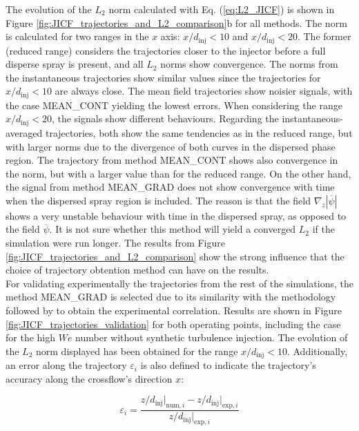 The evolution of the $L_2$ norm calculated with Eq. (\ref{eq:L2_JICF}) is shown in Figure \ref{fig:JICF_trajectories_and_L2_comparison}b for all methods. The norm is calculated for two ranges in the $x$ axis: $x/d_\mathrm{inj} < 10$ and $x/d_\mathrm{inj} < 20$. The former (reduced range) considers the trajectories closer to the injector before a full disperse spray is present, and all $L_2$ norms show convergence. The norms from the instantaneous trajectories show similar values since the trajectories for $x/d_\mathrm{inj} < 10$ are always close. The mean field trajectories show noisier signals, with the case MEAN\_CONT yielding the lowest errors. When considering the range $x/d_\mathrm{inj} < 20$, the signals show different behaviours. Regarding the instantaneous-averaged trajectories, both show the same tendencies as in the reduced range, but with larger norms due to the divergence of both curves in the dispersed phase region. The trajectory from method MEAN\_CONT shows also convergence in the norm, but with a larger value than for the reduced range. On the other hand, the signal from method MEAN\_GRAD does not show convergence with time when the dispersed spray region is included. The reason is that the field $\nabla_z | \overline{\psi} |$ shows a very unstable behaviour with time in the dispersed spray, as opposed to the field $\overline{\psi}$. It is not sure whether this method will yield a converged $L_2$ if the simulation were run longer. The results from Figure \ref{fig:JICF_trajectories_and_L2_comparison} show the strong influence that the choice of trajectory obtention method can have on the results.  \\

For validating experimentally the trajectories from the rest of the simulations, the method MEAN\_GRAD is selected due to its similarity with the methodology followed by  to obtain the experimental correlation. Results are shown in Figure \ref{fig:JICF_trajectories_validation} for both operating points, including the case for the high $We$ number without synthetic turbulence injection. The evolution of the $L_2$ norm displayed has been obtained for the range $x/d_\mathrm{inj} < 10$. Additionally, an error along the trajectory  $\varepsilon_i$ is also defined to indicate the trajectory’s accuracy along the crossflow’s direction $x$:

\begin{equation}
\label{eq:error_along_trajectory}
\varepsilon_i  =  \frac{ z/d_\mathrm{inj} \Bigr|_{\mathrm{num},i} - z/d_\mathrm{inj} \Bigr|_{\mathrm{exp},i} }{ z/d_\mathrm{inj} \Bigr|_{\mathrm{exp},i} }
\end{equation}



